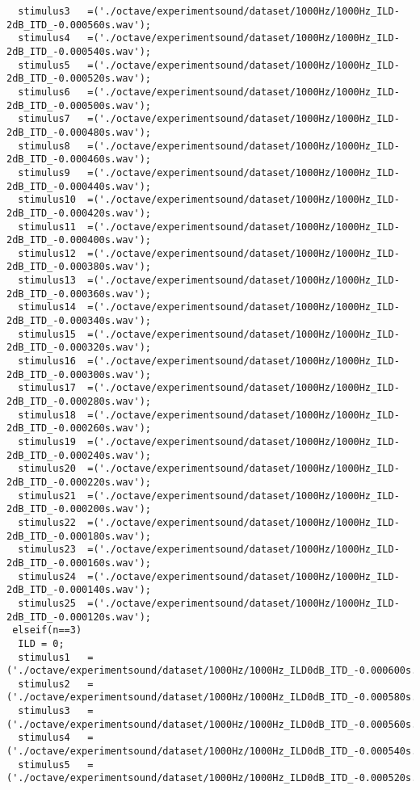 {\begin{verbatim}
  stimulus3   =('./octave/experimentsound/dataset/1000Hz/1000Hz_ILD-2dB_ITD_-0.000560s.wav');
  stimulus4   =('./octave/experimentsound/dataset/1000Hz/1000Hz_ILD-2dB_ITD_-0.000540s.wav');
  stimulus5   =('./octave/experimentsound/dataset/1000Hz/1000Hz_ILD-2dB_ITD_-0.000520s.wav');
  stimulus6   =('./octave/experimentsound/dataset/1000Hz/1000Hz_ILD-2dB_ITD_-0.000500s.wav');
  stimulus7   =('./octave/experimentsound/dataset/1000Hz/1000Hz_ILD-2dB_ITD_-0.000480s.wav');
  stimulus8   =('./octave/experimentsound/dataset/1000Hz/1000Hz_ILD-2dB_ITD_-0.000460s.wav');
  stimulus9   =('./octave/experimentsound/dataset/1000Hz/1000Hz_ILD-2dB_ITD_-0.000440s.wav');
  stimulus10  =('./octave/experimentsound/dataset/1000Hz/1000Hz_ILD-2dB_ITD_-0.000420s.wav');
  stimulus11  =('./octave/experimentsound/dataset/1000Hz/1000Hz_ILD-2dB_ITD_-0.000400s.wav');
  stimulus12  =('./octave/experimentsound/dataset/1000Hz/1000Hz_ILD-2dB_ITD_-0.000380s.wav');
  stimulus13  =('./octave/experimentsound/dataset/1000Hz/1000Hz_ILD-2dB_ITD_-0.000360s.wav');
  stimulus14  =('./octave/experimentsound/dataset/1000Hz/1000Hz_ILD-2dB_ITD_-0.000340s.wav');
  stimulus15  =('./octave/experimentsound/dataset/1000Hz/1000Hz_ILD-2dB_ITD_-0.000320s.wav');
  stimulus16  =('./octave/experimentsound/dataset/1000Hz/1000Hz_ILD-2dB_ITD_-0.000300s.wav');
  stimulus17  =('./octave/experimentsound/dataset/1000Hz/1000Hz_ILD-2dB_ITD_-0.000280s.wav');
  stimulus18  =('./octave/experimentsound/dataset/1000Hz/1000Hz_ILD-2dB_ITD_-0.000260s.wav');
  stimulus19  =('./octave/experimentsound/dataset/1000Hz/1000Hz_ILD-2dB_ITD_-0.000240s.wav');
  stimulus20  =('./octave/experimentsound/dataset/1000Hz/1000Hz_ILD-2dB_ITD_-0.000220s.wav');
  stimulus21  =('./octave/experimentsound/dataset/1000Hz/1000Hz_ILD-2dB_ITD_-0.000200s.wav');
  stimulus22  =('./octave/experimentsound/dataset/1000Hz/1000Hz_ILD-2dB_ITD_-0.000180s.wav');
  stimulus23  =('./octave/experimentsound/dataset/1000Hz/1000Hz_ILD-2dB_ITD_-0.000160s.wav');
  stimulus24  =('./octave/experimentsound/dataset/1000Hz/1000Hz_ILD-2dB_ITD_-0.000140s.wav');
  stimulus25  =('./octave/experimentsound/dataset/1000Hz/1000Hz_ILD-2dB_ITD_-0.000120s.wav');
 elseif(n==3)
  ILD = 0;
  stimulus1   =('./octave/experimentsound/dataset/1000Hz/1000Hz_ILD0dB_ITD_-0.000600s.wav');
  stimulus2   =('./octave/experimentsound/dataset/1000Hz/1000Hz_ILD0dB_ITD_-0.000580s.wav');
  stimulus3   =('./octave/experimentsound/dataset/1000Hz/1000Hz_ILD0dB_ITD_-0.000560s.wav');
  stimulus4   =('./octave/experimentsound/dataset/1000Hz/1000Hz_ILD0dB_ITD_-0.000540s.wav');
  stimulus5   =('./octave/experimentsound/dataset/1000Hz/1000Hz_ILD0dB_ITD_-0.000520s.wav');

\end{verbatim}}

